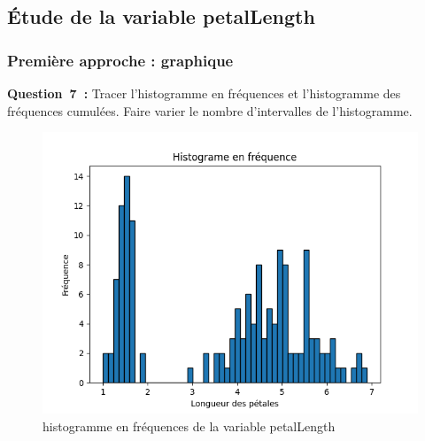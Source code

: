 \subsection{Étude de la variable petalLength}
\subsubsection*{Première approche : graphique}

\vspace{.2cm}

\noindent
\textbf{Question~7~:} Tracer l’histogramme en fréquences et l’histogramme des fréquences cumulées. Faire varier le nombre d’intervalles de l’histogramme.

\vspace{.2cm}

\begin{figure}[!h]
    \centering
    \begin{minipage}{.48\linewidth}
        \begin{center}
            \includegraphics[width=1.1\textwidth]{img/Figure_3.png}
            \caption{\label{fig:histogramme_freq-petalLength}histogramme en fréquences de la variable petalLength}  
    \end{center}
    \end{minipage}\hfill
    \begin{minipage}{.48\linewidth}
        \begin{center}

\end{center}
\end{minipage}
\end{figure}
